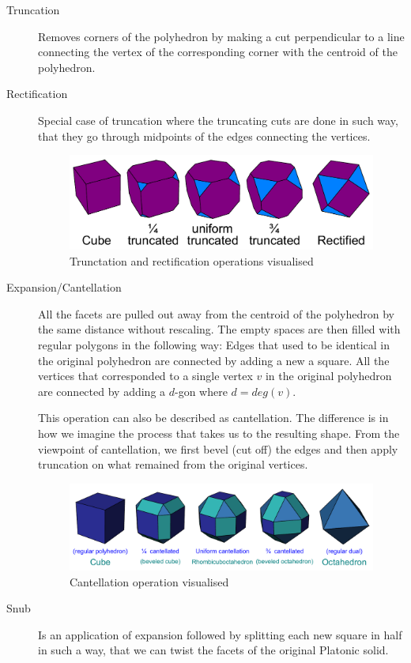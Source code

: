 \begin{description}
    \item[Truncation] Removes corners of the polyhedron by making a cut perpendicular to a line connecting the vertex of the corresponding corner with the centroid of the polyhedron.
    \item[Rectification] Special case of truncation where the truncating cuts are done in such way, that they go through midpoints of the edges connecting the vertices. 
    \begin{figure}[H]
        \centering
        \includegraphics[width=1\textwidth]{../Resources/Figs/truncation.pdf}
        \caption{Trunctation and rectification operations visualised \cite{wikimedia-cube-truncation}}
        \label{fig:truncation}
    \end{figure}
    \item[Expansion/Cantellation] All the facets are pulled out away from the centroid of the polyhedron by the same distance without rescaling. The empty spaces are then filled with regular polygons in the following way: Edges that used to be identical in the original polyhedron are connected by adding a new a square. All the vertices that corresponded to a single vertex $v$ in the original polyhedron are connected by adding a $d$-gon where $d=deg(v)$.

    This operation can also be described as cantellation. The difference is in how we imagine the process that takes us to the resulting shape. From the viewpoint of cantellation, we first bevel (cut off) the edges and then apply truncation on what remained from the original vertices.
        \begin{figure}[H]
        \centering
        \includegraphics[width=1\textwidth]{../Resources/Figs/cantellation.pdf}
        \caption{Cantellation operation visualised \cite{wikimedia-cube-cantellation}}
        \label{fig:cantellation}
    \end{figure}
    \item[Snub] Is an application of expansion followed by splitting each new square in half in such a way, that we can twist the facets of the original Platonic solid.
\end{description}




